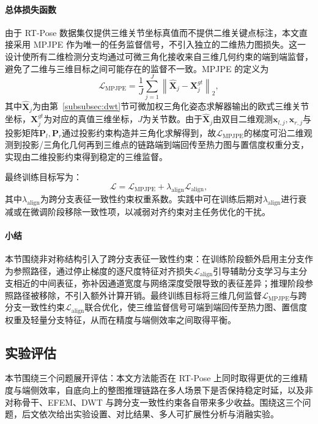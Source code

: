 \paragraph{总体损失函数}
由于 RT-Pose 数据集仅提供三维关节坐标真值而不提供二维关键点标注，本文直接采用 MPJPE 作为唯一的任务监督信号，不引入独立的二维热力图损失。这一设计使所有二维检测分支均通过可微三角化接收来自三维几何约束的端到端监督，避免了二维与三维目标之间可能存在的监督不一致。MPJPE 的定义为
\begin{equation}
\mathcal{L}_{\text{MPJPE}}
=
\frac{1}{J}
\sum_{j=1}^{J}
\left\|
\hat{\mathbf{X}}_{j}
-
\mathbf{X}^{gt}_{j}
\right\|_2,
\label{eq:loss_mpjpe}
\end{equation}
其中$\hat{\mathbf{X}}_{j}$为由第~\ref{subsubsec:dwt}节可微加权三角化姿态求解器输出的欧式三维关节坐标，$\mathbf{X}^{gt}_{j}$为对应的真值三维坐标，$J$为关节数。由于$\hat{\mathbf{X}}_{j}$由双目二维观测$\mathbf{x}_{l,j},\mathbf{x}_{r,j}$与投影矩阵$\mathbf{P}_l,\mathbf{P}_r$通过投影约束构造并三角化求解得到，故$\mathcal{L}_{\text{MPJPE}}$的梯度可沿二维观测到投影/三角化几何再到三维点的链路端到端回传至热力图与置信度权重分支，实现由二维投影约束得到稳定的三维监督。

最终训练目标写为：
\begin{equation}
\mathcal{L}
=
\mathcal{L}_{\text{MPJPE}}
+
\lambda_{\text{align}}\mathcal{L}_{\text{align}},
\label{eq:loss_total}
\end{equation}
其中$\lambda_{\text{align}}$为跨分支表征一致性约束权重系数。实践中可在训练后期对$\lambda_{\text{align}}$进行衰减或在微调阶段移除一致性项，以减弱对齐约束对主任务优化的干扰。

\paragraph{小结}
本节围绕非对称结构引入了跨分支表征一致性约束：在训练阶段额外启用主分支作为参照路径，通过停止梯度的逐尺度特征对齐损失$\mathcal{L}_{\text{align}}$引导辅助分支学习与主分支相近的中间表征，弥补因通道宽度与网络深度受限导致的表征差异；推理阶段参照路径被移除，不引入额外计算开销。最终训练目标将三维几何监督$\mathcal{L}_{\text{MPJPE}}$与跨分支一致性约束$\mathcal{L}_{\text{align}}$联合优化，使三维监督信号可端到端回传至热力图、置信度权重及轻量分支特征，从而在精度与端侧效率之间取得平衡。

\subsection{实验评估}
本节围绕三个问题展开评估：本文方法能否在 RT-Pose 上同时取得更优的三维精度与端侧效率，自底向上的整图推理链路在多人场景下是否保持稳定时延，以及非对称骨干、EFEM、DWT 与跨分支一致性约束各自带来多少收益。围绕这三个问题，后文依次给出实验设置、对比结果、多人可扩展性分析与消融实验。

